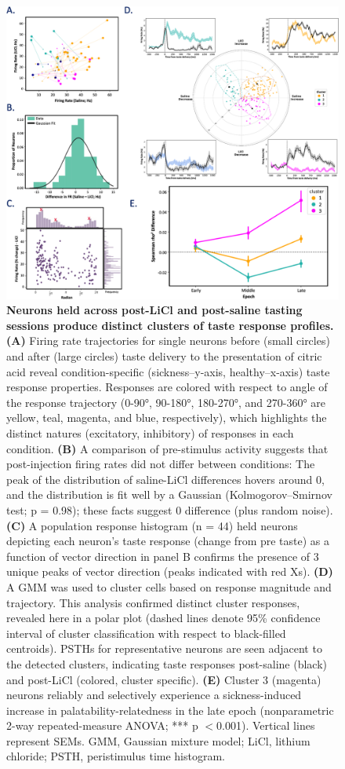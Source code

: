 \begin{refsection}
\begin{figure}
\centering
\includegraphics[width=0.8\linewidth]{stone_2022_figs/journal.pbio.3001537.g008.png} 
\caption{\textbf{Neurons held across post-LiCl and post-saline tasting sessions produce distinct clusters of taste response profiles.} \textbf{(A)} Firing rate trajectories for single neurons before (small circles) and after (large circles) taste delivery to the presentation of citric acid reveal condition-specific (sickness–y-axis, healthy–x-axis) taste response properties. Responses are colored with respect to angle of the response trajectory (0-90°, 90-180°, 180-270°, and 270-360° are yellow, teal, magenta, and blue, respectively), which highlights the distinct natures (excitatory, inhibitory) of responses in each condition. \textbf{(B)} A comparison of pre-stimulus activity suggests that post-injection firing rates did not differ between conditions: The peak of the distribution of saline-LiCl differences hovers around 0, and the distribution is fit well by a Gaussian (Kolmogorov–Smirnov test; p = 0.98); these facts suggest 0 difference (plus random noise). \textbf{(C)} A population response histogram (n = 44) held neurons depicting each neuron’s taste response (change from pre taste) as a function of vector direction in panel B confirms the presence of 3 unique peaks of vector direction (peaks indicated with red Xs). \textbf{(D)} A GMM was used to cluster cells based on response magnitude and trajectory. This analysis confirmed distinct cluster responses, revealed here in a polar plot (dashed lines denote 95\% confidence interval of cluster classification with respect to black-filled centroids). PSTHs for representative neurons are seen adjacent to the detected clusters, indicating taste responses post-saline (black) and post-LiCl (colored, cluster specific). \textbf{(E)} Cluster 3 (magenta) neurons reliably and selectively experience a sickness-induced increase in palatability-relatedness in the late epoch (nonparametric 2-way repeated-measure ANOVA; *** p \(<\)0.001). Vertical lines represent SEMs. GMM, Gaussian mixture model; LiCl, lithium chloride; PSTH, peristimulus time histogram.
}
\label{fig:wrapfig}
\end{figure}


\end{refsection}
